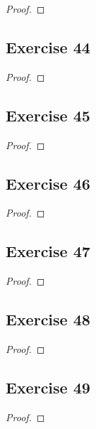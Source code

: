 \documentclass[14pt]{extarticle}
\begin{document}
\begin{proof}

\end{proof}

\subsection{Exercise 44}

\begin{proof}

\end{proof}

\subsection{Exercise 45}

\begin{proof}

\end{proof}

\subsection{Exercise 46}

\begin{proof}

\end{proof}

\subsection{Exercise 47}

\begin{proof}

\end{proof}

\subsection{Exercise 48}

\begin{proof}

\end{proof}

\subsection{Exercise 49}

\begin{proof}

\end{proof}
\end{document}
